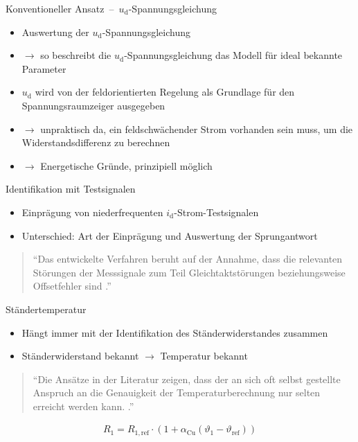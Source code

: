 \documentclass{beamer}
\newcommand{\x}[1]{\mathrm{#1}}
\begin{document}
\begin{frame}{Konventioneller Ansatz~--~$u_\x{d}$-Spannungsgleichung}
\begin{itemize}
	\item Auswertung der $u_\x{d}$-Spannungsgleichung
	\item $\rightarrow$ so beschreibt die $u_\x{d}$-Spannungsgleichung das Modell für ideal bekannte Parameter
	\item $u_\x{d}$ wird von der feldorientierten Regelung als Grundlage für den Spannungsraumzeiger ausgegeben
\pause	\item $\rightarrow$ unpraktisch da, ein feldschwächender Strom vorhanden sein muss, um die Widerstandsdifferenz zu berechnen \autocite{Kellner2012}
\pause 	\item $\rightarrow$ Energetische Gründe, prinzipiell möglich
\end{itemize}
\end{frame}

\begin{frame}{Identifikation mit Testsignalen}
	\begin{itemize}
		\item Einprägung von niederfrequenten $i_\x{d}$-Strom-Testsignalen
		\item Unterschied: Art der Einprägung und Auswertung der Sprungantwort
	\end{itemize}
	
	\begin{quote}
		\enquote{Das entwickelte Verfahren beruht auf der Annahme, dass die relevanten Störungen der Messsignale zum Teil Gleichtaktstörungen beziehungsweise Offsetfehler sind \autocite[S.~148]{Kellner2012}.}
	\end{quote}
	
\end{frame}

\begin{frame}{Ständertemperatur}
	\begin{itemize}
		\item Hängt immer mit der Identifikation des Ständerwiderstandes zusammen
		\item Ständerwiderstand bekannt $\rightarrow$ Temperatur bekannt
	\end{itemize}
	
		\begin{quote}
			\enquote{Die Ansätze in der Literatur zeigen, dass der an sich oft selbst gestellte Anspruch an die Genauigkeit der Temperaturberechnung nur selten erreicht werden kann. \autocite[S.~175]{Kellner2012}.}
		\end{quote}
		
\begin{align}
R_\x{1} = R_\x{1,ref} \cdot (1 + \alpha_\x{Cu}(\vartheta_\x{1}-\vartheta_\x{ref}))
\end{align}
	
\end{frame}
\end{document}
